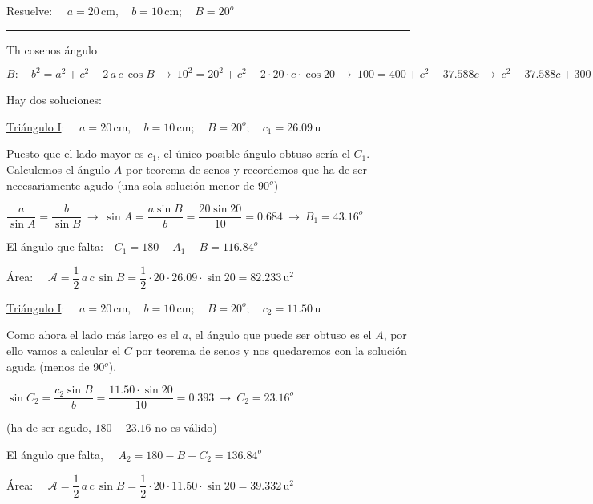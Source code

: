 \begin{miejercicio}

Resuelve: $\quad a=20\, \mathrm{cm},\quad b= 10\,  \mathrm{cm};\quad B=20^o$

\rule{250pt}{0.1pt}
 
\vspace{2mm} Th cosenos ángulo $B:\quad  b^2=a^2+c^2-2\, a\, c\, \cos B \ \to \ 10^2=20^2+c^2-2\cdot 20\cdot c\cdot \cos 20 \ \to \ 100=400+c^2-37.588c \ \to \ c^2-37.588 c+300=0 \ \to \ c=\dfrac{37.588\pm \sqrt{37.588^2-4\cdot 1\cdot 300}}{2\cdot 1}=\dfrac{37.588\pm14.590}{2}\  \to \ \begin{cases}
 \ c_1=26.09 \\ \ c_2=	11.50
 \end{cases}\qquad $ Hay dos soluciones:

\vspace{2mm} \underline{Triángulo I}: $\quad a=20\, \mathrm{cm},\quad b= 10\,  \mathrm{cm};\quad B=20^o;\quad c_1=26.09\, \mathrm{u}$

\vspace{2mm} Puesto que el lado mayor es $c_1$, el único posible ángulo obtuso sería el $C_1$. Calculemos el ángulo $A$ por teorema de senos y recordemos que ha de ser necesariamente agudo (una sola solución menor de 90$^o$)

\vspace{2mm} $\dfrac{a}{\sin A}=\dfrac{b}{\sin B} \ \to \ \sin A=\dfrac{a\sin B}{b}=\dfrac{20\sin 20}{10}=0.684 \ \to \ B_1=43.16^o $

\vspace{2mm} El ángulo que falta:$\quad C_1=180-A_1-B=116.84^o$

\vspace{2mm} Área: $\quad\mathcal A=\dfrac 1 2 \, a\, c\, \sin B = \dfrac 12 \cdot 20 \cdot 26.09\cdot \sin 20=82.233\, \mathrm{u}^2$

\vspace{2mm}\underline{Triángulo I}: $\quad a=20\, \mathrm{cm},\quad b= 10\,  \mathrm{cm};\quad B=20^o;\quad c_2=11.50\, \mathrm{u}$

\vspace{2mm} Como ahora el lado más largo es el $a$, el ángulo que puede ser obtuso es el $A$, por ello vamos a calcular el $C$ por teorema de senos y nos quedaremos con la solución aguda (menos de 90$^o$).

\vspace{2mm} $\sin C_2=\dfrac{c_2\sin B}{b}=\dfrac{11.50\cdot \sin 20}{10}= 0.393 \ \to \ C_2=23.16^o\ $ \begin{tiny} (ha de ser agudo, $180-23.16$ no es válido) \end{tiny}

\vspace{2mm} El ángulo que falta, $\quad A_2=180-B-C_2=136.84^o$

\vspace{2mm} Área: $\quad\mathcal A=\dfrac 1 2 \, a\, c\, \sin B = \dfrac 12 \cdot 20 \cdot 11.50 \cdot \sin 20=39.332\, \mathrm{u}^2$
	 
\end{miejercicio}


